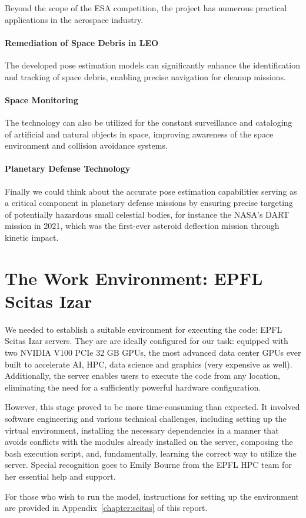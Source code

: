 Beyond the scope of the \ac{ESA} competition, the project has numerous practical applications in the aerospace industry.

\paragraph{Remediation of Space Debris in \ac{LEO}} The developed pose estimation models can significantly enhance the identification and tracking of space debris, enabling precise navigation for cleanup missions.

\paragraph{Space Monitoring} The technology can also be utilized for the constant surveillance and cataloging of artificial and natural objects in space, improving awareness of the space environment and collision avoidance systems.

\paragraph{Planetary Defense Technology} Finally we could think about the accurate pose estimation capabilities serving as a critical component in planetary defense missions by ensuring precise targeting of potentially hazardous small celestial bodies, for instance the NASA’s \ac{DART} mission in 2021, which was the first-ever asteroid deflection mission through kinetic impact.

\section{The Work Environment: EPFL Scitas Izar}

We needed to establish a suitable environment for executing the code: EPFL Scitas Izar servers. They are are ideally configured for our task: equipped with two NVIDIA V100 PCIe 32 GB GPUs, the most advanced data center GPUs ever built to accelerate \ac{AI}, \ac{HPC}, data science and graphics (very expensive as well). Additionally, the server enables users to execute the code from any location, eliminating the need for a sufficiently powerful hardware configuration.

However, this stage proved to be more time-consuming than expected. It involved software engineering and various technical challenges, including setting up the virtual environment, installing the necessary dependencies in a manner that avoids conflicts with the modules already installed on the server, composing the bash execution script, and, fundamentally, learning the correct way to utilize the server. Special recognition goes to Emily Bourne from the EPFL \ac{HPC} team for her essential help and support.

For those who wish to run the model, instructions for setting up the environment are provided in Appendix~\ref{chapter:scitas} of this report.
